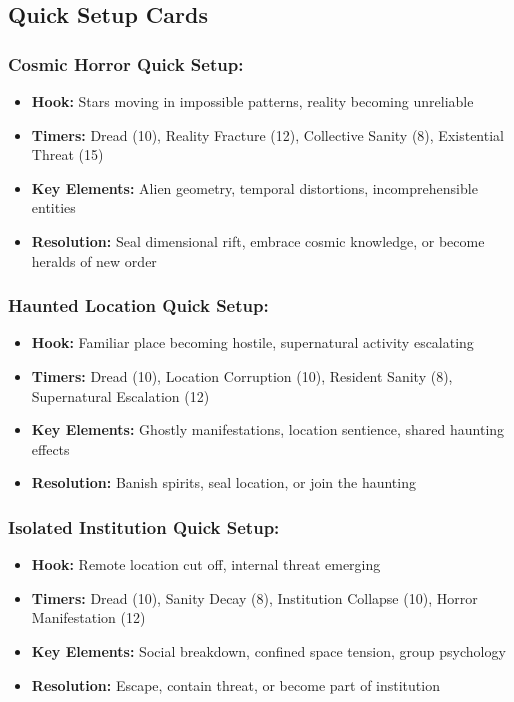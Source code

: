 \documentclass[11pt]{article}
\begin{document}
\subsection{Quick Setup Cards}

\subsubsection{Cosmic Horror Quick Setup:}
\begin{itemize}
\item \textbf{Hook:} Stars moving in impossible patterns, reality becoming unreliable
\item \textbf{Timers:} Dread (10), Reality Fracture (12), Collective Sanity (8), Existential Threat (15)
\item \textbf{Key Elements:} Alien geometry, temporal distortions, incomprehensible entities
\item \textbf{Resolution:} Seal dimensional rift, embrace cosmic knowledge, or become heralds of new order
\end{itemize}

\subsubsection{Haunted Location Quick Setup:}
\begin{itemize}
\item \textbf{Hook:} Familiar place becoming hostile, supernatural activity escalating
\item \textbf{Timers:} Dread (10), Location Corruption (10), Resident Sanity (8), Supernatural Escalation (12)
\item \textbf{Key Elements:} Ghostly manifestations, location sentience, shared haunting effects
\item \textbf{Resolution:} Banish spirits, seal location, or join the haunting
\end{itemize}

\subsubsection{Isolated Institution Quick Setup:}
\begin{itemize}
\item \textbf{Hook:} Remote location cut off, internal threat emerging
\item \textbf{Timers:} Dread (10), Sanity Decay (8), Institution Collapse (10), Horror Manifestation (12)
\item \textbf{Key Elements:} Social breakdown, confined space tension, group psychology
\item \textbf{Resolution:} Escape, contain threat, or become part of institution
\end{itemize}
\end{document}

